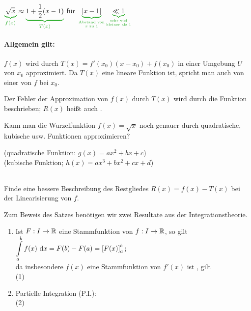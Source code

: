 $\greenunderbrace{\sqrt{x}}{f(x)}\approx\greenunderbrace{1+\frac{1}{2}(x-1)}{T(x)}$ für $\greenunderbrace{|x-1|}{\text{Abstand von}\atop x \text{ zu } 1}\greenunderbrace{\ll1}{\text{sehr viel}\atop\text{kleiner als }1}$

\paragraph{Allgemein gilt:} $f(x)$ wird durch $T(x)=f'(x_0)(x-x_0)+f(x_0)$ in einer Umgebung $U$ von $x_0$ approximiert. Da $T(x)$ eine lineare Funktion ist, spricht man auch von einer  von $f$ bei $x_0$.

Der Fehler der Approximation von $f(x)$ durch $T(x)$ wird durch die Funktion
beschrieben; $R(x)$ heißt auch .

 Kann man die Wurzelfunktion $f(x)=\sqrt{x}$ noch genauer durch quadratische, kubische usw. Funktionen approximieren?

(quadratische Funktion: $g(x)=ax^2+bx+c$)\\
(kubische Funktion; $h(x)=ax^3+bx^2+cx+d$)

\\
Finde eine bessere Beschreibung des Restgliedes $R(x)=f(x)-T(x)$ bei der Linearisierung von $f$.


Zum Beweis des Satzes benötigen wir zwei Resultate aus der Integrationstheorie.

\begin{enumerate}
	\item Ist $F:I\to\mathbb{R}$ eine Stammfunktion von $f:I\to\mathbb{R}$, so gilt\\
	\hhspace{2cm}$\displaystyle\int\limits_{a}^{b}f(x)\ \mathrm{d}x=F(b)-F(a)=\left[F(x)\right]_a^b;$\\
	da insbesondere $f(x)$ eine Stammfunktion von $f'(x)$ ist , gilt \\
	\hhspace{2cm}\quad(1)
	
	\item Partielle Integration (P.I.):\\
	\hhspace{2cm}\quad(2)
\end{enumerate}

